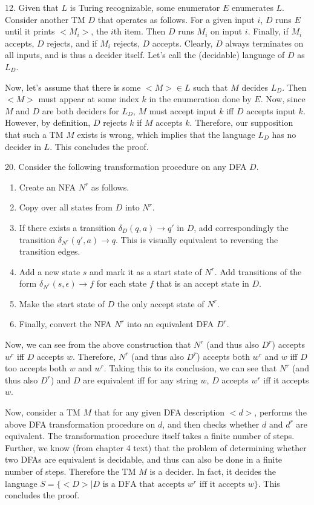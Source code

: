 \documentclass{article}
\begin{document}
12. Given that $L$ is Turing recognizable, some enumerator $E$ enumerates $L$. Consider another TM $D$ that operates as follows. For a given input $i$, $D$ runs $E$ until it prints $<M_i>$, the $i$th item. Then $D$ runs $M_i$ on input $i$. Finally, if $M_i$ accepts, $D$ rejects, and if $M_i$ rejects, $D$ accepts. Clearly, $D$ always terminates on all inputs, and is thus a decider itself. Let's call the (decidable) language of $D$ as $L_D$.

Now, let's assume that there is some $<M> \in L$ such that $M$ decides $L_D$. Then $<M>$ must appear at some index $k$ in the enumeration done by $E$. Now, since $M$ and $D$ are both deciders for $L_D$, $M$ must accept input $k$ iff $D$ accepts input $k$. However, by definition, $D$ rejects $k$ if $M$ accepts $k$. Therefore, our supposition that such a TM $M$ exists is wrong, which implies that the language $L_D$ has no decider in $L$. This concludes the proof.

20. Consider the following transformation procedure on any DFA $D$.

\begin{enumerate}
    \item Create an NFA $N^r$ as follows.
    \item Copy over all states from $D$ into $N^r$.
    \item If there exists a transition $\delta_D(q, a) \rightarrow q'$ in $D$, add correspondingly the transition $\delta_{N^r}(q', a) \rightarrow q$. This is visually equivalent to reversing the transition edges.
    \item Add a new state $s$ and mark it as a start state of $N^r$. Add transitions of the form $\delta_{N^r}(s, \epsilon) \rightarrow f$ for each state $f$ that is an accept state in $D$.
    \item Make the start state of $D$ the only accept state of $N^r$.
    \item Finally, convert the NFA $N^r$ into an equivalent DFA $D^r$.
\end{enumerate}

Now, we can see from the above construction that $N^r$ (and thus also $D^r$) accepts $w^r$ iff $D$ accepts $w$. Therefore, $N^r$ (and thus also $D^r$) accepts both $w^r$ and $w$ iff $D$ too accepts both $w$ and $w^r$. Taking this to its conclusion, we can see that $N^r$ (and thus also $D^r$) and $D$ are equivalent iff for any string $w$, $D$ accepts $w^r$ iff it accepts $w$.

Now, consider a TM $M$ that for any given DFA description $<d>$, performs the above DFA transformation procedure on $d$, and then checks whether $d$ and $d^r$ are equivalent. The transformation procedure itself takes a finite number of steps. Further, we know (from chapter 4 text) that the problem of determining whether two DFAs are equivalent is decidable, and thus can also be done in a finite number of steps. Therefore the TM $M$ is a decider. In fact, it decides the language $S = \{ <D> \mid D \text{ is a DFA that accepts } w^r \text{ iff it accepts } w \}$. This concludes the proof.
\end{document}

